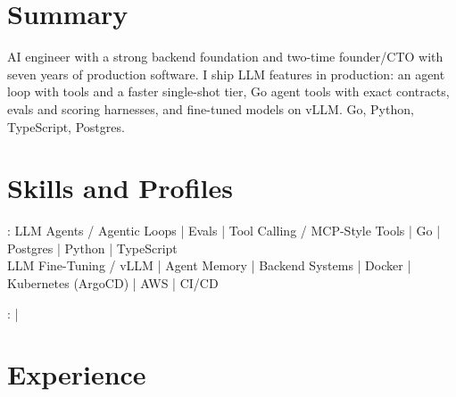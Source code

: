 \documentclass[print]{jack-resume}
\begin{document}
\pagecolor{darkmodeBackground}


\begin{minipage}[t][1cm][t]{.03\textwidth}
    \hfill
\end{minipage}

\section{Summary}
AI engineer with a strong backend foundation and two-time founder/CTO with seven years of production software. I ship LLM features in production: an agent loop with tools and a faster single-shot tier, Go agent tools with exact contracts, evals and scoring harnesses, and fine-tuned models on vLLM. Go, Python, TypeScript, Postgres.
\sectionsep

\section{Skills and Profiles}
:
LLM Agents / Agentic Loops \hfill | \hfill
Evals \hfill | \hfill
Tool Calling / MCP-Style Tools \hfill | \hfill
Go \hfill | \hfill
Postgres \hfill | \hfill
Python \hfill | \hfill
TypeScript \\
\hspace{1.0cm} LLM Fine-Tuning / vLLM \hfill | \hfill
Agent Memory \hfill | \hfill
Backend Systems \hfill | \hfill
Docker \hfill | \hfill
Kubernetes (ArgoCD) \hfill | \hfill
AWS \hfill | \hfill
CI/CD \\

\raggedright{
    :
      \href{https://www.linkedin.com/in/jack-sturtevant/}{ \ExternalLink} |
     \href{https://github.com/jacksturt}{ \ExternalLink}}

\section{Experience}
\end{document}
